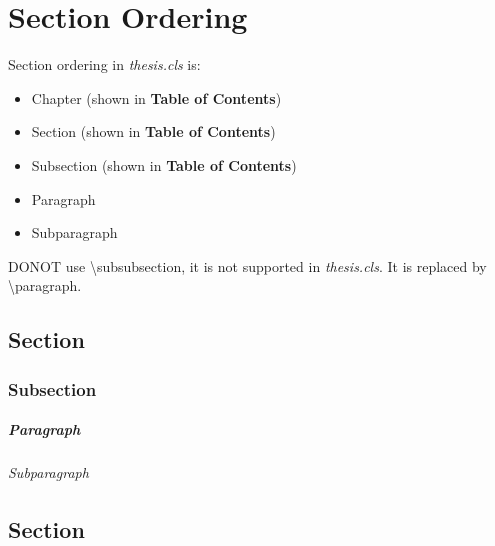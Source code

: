 \chapter{Section Ordering}
\label{chapter:secorder}

Section ordering in \textit{thesis.cls} is:
\begin{itemize}
\item Chapter (shown in \textbf{Table of Contents})
\item Section (shown in \textbf{Table of Contents})
\item Subsection (shown in \textbf{Table of Contents})
\item Paragraph
\item Subparagraph
\end{itemize}
DONOT use \textbackslash subsubsection, it is not supported in \textit{thesis.cls}.
It is replaced by \textbackslash paragraph.

\section{Section}
\label{sec:secorder}
\lipsum[1-2]  %

\subsection{Subsection}
\label{subsec:secorder}
\lipsum[3-4]  %

\paragraph{Paragraph}
\lipsum[5-6]  %

\subparagraph{Subparagraph}
\lipsum[7]  %

\section{Section}
\label{sec:secorder}
\lipsum[8]  %